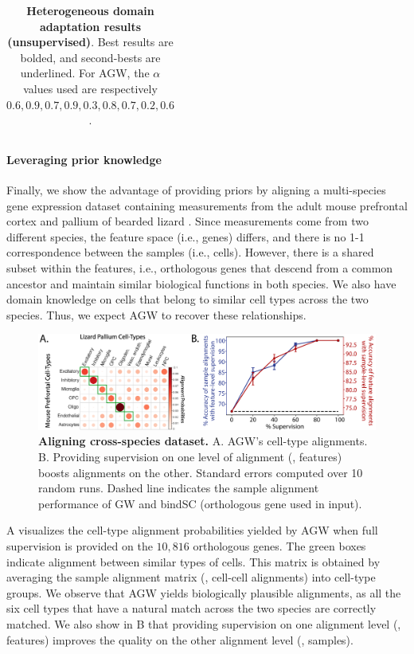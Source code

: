\begin{table}[t]
\begin{center}
{\begin{tabular}{@{}lccccccccc@{}}
\bottomrule
\end{tabular}}
\end{center}
\caption{\label{tab:hda_agw}
\textbf{Heterogeneous domain adaptation results (unsupervised)}.
Best results are bolded, and second-bests are underlined. For AGW,
the $\alpha$ values used are respectively $0.6, 0.9, 0.7, 0.9, 0.3, 0.8, 0.7, 0.2, 0.6$. }
\end{table}

\paragraph{Leveraging prior knowledge}
Finally, we show the advantage of providing priors by aligning a
multi-species gene expression dataset containing measurements from
the adult mouse prefrontal cortex \citep{mouse} and pallium of bearded lizard \citep{lizard}.
Since measurements come from two different species, the feature space (i.e., genes) differs,
and there is no 1-1 correspondence between the samples (i.e., cells). However,
there is a shared subset within the features, i.e., orthologous genes that
descend from a common ancestor and maintain similar biological functions in both species.
We also have domain knowledge on cells that belong to similar cell types across the two species.
Thus, we expect AGW to recover these relationships.

\begin{figure}[t]
\centering
\includegraphics[width=\linewidth]{./Chapitre5/fig/xSp_full.png}
\caption{\label{fig:xsp} \textbf{Aligning cross-species dataset.}
A. AGW's cell-type alignments.
B. Providing supervision on one level of alignment (\eg, features)
boosts alignments on the other. Standard errors computed over 10 random runs.
Dashed line indicates the sample alignment performance of GW and bindSC
(orthologous gene used in input).}
\end{figure}

A visualizes the cell-type alignment probabilities yielded by AGW
when full supervision is provided on the $10,816$ orthologous genes.
The green boxes indicate alignment between similar types of cells.
This matrix is obtained by averaging the sample alignment matrix
(\ie, cell-cell alignments) into cell-type groups. We observe that
AGW yields biologically plausible alignments, as all the six cell types that
have a natural match across the two species are correctly matched.
We also show in B that providing supervision on one alignment level (\eg,
features) improves the quality on the other alignment level (\eg, samples).

